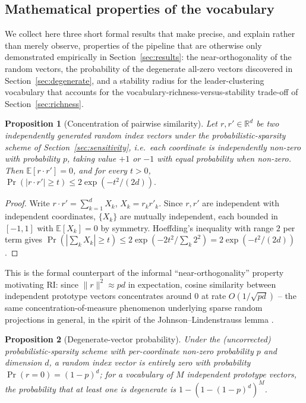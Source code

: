 \documentclass[11pt]{article}
\newtheorem{proposition}{Proposition}
\begin{document}
\subsection{Mathematical properties of the vocabulary}
\label{sec:theory}

We collect here three short formal results that make precise, and explain rather than merely observe, properties of the pipeline that are otherwise only demonstrated empirically in Section~\ref{sec:results}: the near-orthogonality of the random vectors, the probability of the degenerate all-zero vectors discovered in Section~\ref{sec:degenerate}, and a stability radius for the leader-clustering vocabulary that accounts for the vocabulary-richness-versus-stability trade-off of Section~\ref{sec:richness}.

\begin{proposition}[Concentration of pairwise similarity]
\label{prop:orthogonality}
Let $r, r' \in \mathbb{R}^d$ be two independently generated random index vectors under the probabilistic-sparsity scheme of Section~\ref{sec:sensitivity}, i.e.\ each coordinate is independently non-zero with probability $p$, taking value $+1$ or $-1$ with equal probability when non-zero. Then $\mathbb{E}[r \cdot r'] = 0$, and for every $t>0$,
$
\Pr(|r \cdot r'| \ge t) \le 2\exp(-t^2/(2d)).
$
\end{proposition}

\begin{proof}
Write $r\cdot r' = \sum_{k=1}^d X_k$, $X_k = r_k r'_k$. Since $r, r'$ are independent with independent coordinates, $\{X_k\}$ are mutually independent, each bounded in $[-1,1]$ with $\mathbb{E}[X_k]=0$ by symmetry. Hoeffding's inequality \citep{hoeffding1963} with range $2$ per term gives $\Pr(|\sum_k X_k|\ge t) \le 2\exp(-2t^2/\sum_k 2^2) = 2\exp(-t^2/(2d))$. \qedhere
\end{proof}

This is the formal counterpart of the informal ``near-orthogonality'' property motivating RI: since $\lVert r\rVert^2 \approx pd$ in expectation, cosine similarity between independent prototype vectors concentrates around $0$ at rate $O(1/\sqrt{pd})$ -- the same concentration-of-measure phenomenon underlying sparse random projections in general, in the spirit of the Johnson--Lindenstrauss lemma \citep{johnson1984}.

\begin{proposition}[Degenerate-vector probability]
\label{prop:degenerate}
Under the (uncorrected) probabilistic-sparsity scheme with per-coordinate non-zero probability $p$ and dimension $d$, a random index vector is entirely zero with probability $\Pr(r=0)=(1-p)^d$; for a vocabulary of $M$ independent prototype vectors, the probability that at least one is degenerate is $1-(1-(1-p)^d)^M$.
\end{proposition}
\end{document}
